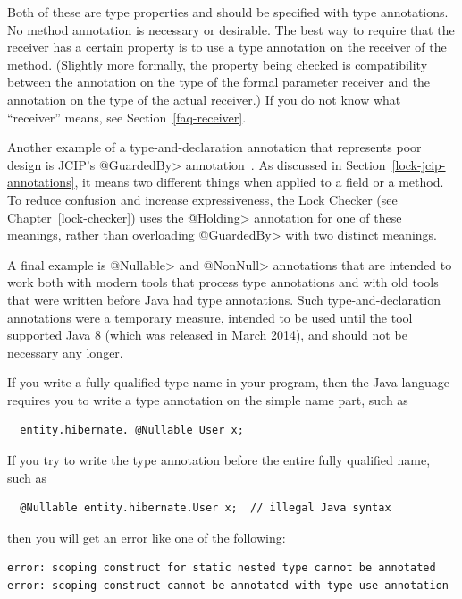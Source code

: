 Both of these are type properties and should be specified with type
annotations.  No method annotation is necessary or desirable.  The best way
to require that the receiver has a certain property is to use a type
annotation on the receiver of the method.  (Slightly more formally, the
property being checked is compatibility between the annotation on the type
of the formal parameter receiver and the annotation on the type of the
actual receiver.)  If you do not know what ``receiver'' means, see
Section~\ref{faq-receiver}.

Another example of a type-and-declaration annotation that represents poor
design is JCIP's \<@GuardedBy> annotation~\cite{Goetz2006}.  As discussed
in Section~\ref{lock-jcip-annotations}, it means two different things when
applied to a field or a method.  To reduce confusion and increase
expressiveness, the Lock Checker (see Chapter~\ref{lock-checker}) uses the
\<@Holding> annotation for one of these meanings, rather than overloading
\<@GuardedBy> with two distinct meanings.


A final example is \<@Nullable> and \<@NonNull> annotations
that are intended to work both with modern tools
that process type annotations and with old tools that were written before
Java had type annotations.  Such type-and-declaration annotations were a
temporary measure, intended to be used until the tool supported Java 8
(which was released in March 2014), and
should not be necessary any longer.



If you write a fully qualified type name in your program, then the Java
language requires you to write a type annotation on the simple name part,
such as
\begin{Verbatim}
  entity.hibernate. @Nullable User x;
\end{Verbatim}

If you try to write the type annotation before the entire fully qualified
name, such as
\begin{Verbatim}
  @Nullable entity.hibernate.User x;  // illegal Java syntax
\end{Verbatim}
\noindent
then you will get an error like one of the following:
\begin{Verbatim}
error: scoping construct for static nested type cannot be annotated
error: scoping construct cannot be annotated with type-use annotation
\end{Verbatim}


